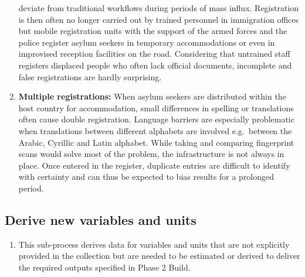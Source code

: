 \documentclass[
]{article}
\providecommand{\tightlist}{%
  \setlength{\itemsep}{0pt}\setlength{\parskip}{0pt}}
\begin{document}
\begin{enumerate}
  deviate from traditional workflows during periods of mass influx.
  Registration is then often no longer carried out by trained
  personnel in immigration offices but mobile registration units with
  the support of the armed forces and the police register asylum
  seekers in temporary accommodations or even in improvised reception
  facilities on the road. Considering that untrained staff registers
  displaced people who often lack official documents, incomplete and
  false registrations are hardly surprising.
\item
  \textbf{Multiple registrations:} When asylum seekers are distributed
  within the host country for accommodation, small differences in
  spelling or translations often cause double registration. Language
  barriers are especially problematic when translations between
  different alphabets are involved e.g.~between the Arabic, Cyrillic
  and Latin alphabet. While taking and comparing fingerprint scans
  would solve most of the problem, the infrastructure is not always in
  place. Once entered in the register, duplicate entries are difficult
  to identify with certainty and can thus be expected to bias results
  for a prolonged period.
\end{enumerate}

\hypertarget{derive-new-variables-and-units-1}{%
\subsection{Derive new variables and units}\label{derive-new-variables-and-units-1}}

\begin{enumerate}
\def\labelenumi{\arabic{enumi}.}
\setcounter{enumi}{388}
\tightlist
\item
  This sub-process derives data for variables and units that are not
  explicitly provided in the collection but are needed to be estimated
  or derived to deliver the required outputs specified in Phase 2
  Build.
\end{enumerate}
\end{document}
